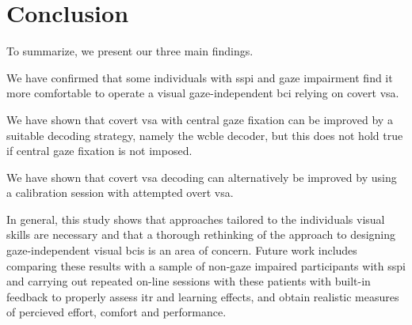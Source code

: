 \section{Conclusion}

To summarize, we present our three main findings.
\begin{enumerate*}
  \item We have confirmed that some individuals with \ac{sspi} and gaze
    impairment find it more comfortable to operate a visual gaze-independent
    \ac{bci} relying on covert \acf{vsa}.
  \item We have shown that covert \acf{vsa} with central gaze fixation can be
    improved by a suitable decoding strategy, namely the \acf{wcble} decoder,
    but this does not hold true if central gaze fixation is not imposed.
  \item We have shown that covert \ac{vsa}
    decoding can alternatively be improved by
    using a calibration session with attempted overt \ac{vsa}.
\end{enumerate*} 

In general, this study shows that approaches tailored to the individuals visual
skills are necessary and that a thorough rethinking of the approach to
designing gaze-independent visual \acp{bci} is an area of concern.
Future work includes comparing these results with a sample of non-gaze impaired
participants with \ac{sspi}
and carrying out repeated on-line sessions with these patients with built-in feedback to
properly assess \ac{itr} and learning effects, and obtain realistic measures of percieved effort,
comfort and performance.



